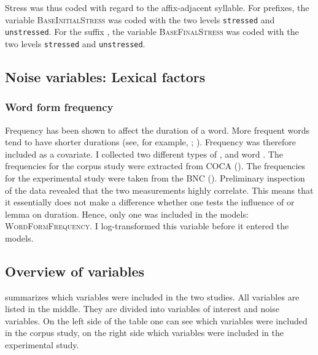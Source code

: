 Stress was thus coded with regard to the affix-adjacent syllable. For prefixes, the variable \textsc{BaseInitialStress} was coded with the two levels \texttt{stressed} and \texttt{unstressed}. For the suffix , the variable \textsc{BaseFinalStress} was coded with the two levels \texttt{stressed} and \texttt{unstressed}.



\subsection{Noise variables: Lexical factors}
\subsubsection{Word form frequency}
Frequency has been shown to affect the duration of a word. More frequent words tend to have shorter durations (see, for example, \citealt{Aylett.2004}; \citealt{Gahl.2008}). Frequency was therefore included as a covariate. I collected two different types of ,  and word . 
The frequencies for the corpus study were extracted from  {COCA} (\citealt{Davies.20082014}). The frequencies for the experimental study were taken from the BNC (\citealt{Davies.2004}).
Preliminary inspection of the data revealed that the two  measurements highly correlate. This means that it essentially does not make a difference whether one tests the influence of  or lemma  on duration. Hence, only one was included in the models: \textsc{WordFormFrequency}. I log-transformed this variable before it entered the models.

\subsection{Overview of variables}
 summarizes which variables were included in the two studies. All variables are listed in the middle. They are divided into variables of interest and noise variables. On the left side of the table one can see which variables were included in the corpus study, on the right side which variables were included in the experimental study.  


